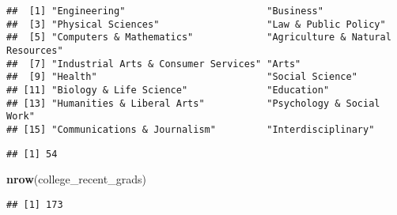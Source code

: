\documentclass[
]{article}
\newenvironment{Shaded}{\begin{snugshade}}{\end{snugshade}}
\newcommand{\CommentTok}[1]{\textcolor[rgb]{0.56,0.35,0.01}{\textit{#1}}}
\newcommand{\DataTypeTok}[1]{\textcolor[rgb]{0.13,0.29,0.53}{#1}}
\newcommand{\KeywordTok}[1]{\textcolor[rgb]{0.13,0.29,0.53}{\textbf{#1}}}
\newcommand{\NormalTok}[1]{#1}
\newcommand{\OperatorTok}[1]{\textcolor[rgb]{0.81,0.36,0.00}{\textbf{#1}}}
\newcommand{\StringTok}[1]{\textcolor[rgb]{0.31,0.60,0.02}{#1}}
\begin{document}
\begin{Shaded}
\end{Shaded}

\begin{verbatim}
##  [1] "Engineering"                         "Business"                           
##  [3] "Physical Sciences"                   "Law & Public Policy"                
##  [5] "Computers & Mathematics"             "Agriculture & Natural Resources"    
##  [7] "Industrial Arts & Consumer Services" "Arts"                               
##  [9] "Health"                              "Social Science"                     
## [11] "Biology & Life Science"              "Education"                          
## [13] "Humanities & Liberal Arts"           "Psychology & Social Work"           
## [15] "Communications & Journalism"         "Interdisciplinary"
\end{verbatim}

\begin{Shaded}
\end{Shaded}

\begin{verbatim}
## [1] 54
\end{verbatim}

\begin{Shaded}
\begin{Highlighting}[]
\KeywordTok{nrow}\NormalTok{(college_recent_grads)}
\end{Highlighting}
\end{Shaded}

\begin{verbatim}
## [1] 173
\end{verbatim}

\begin{Shaded}
\end{Shaded}
\end{document}
